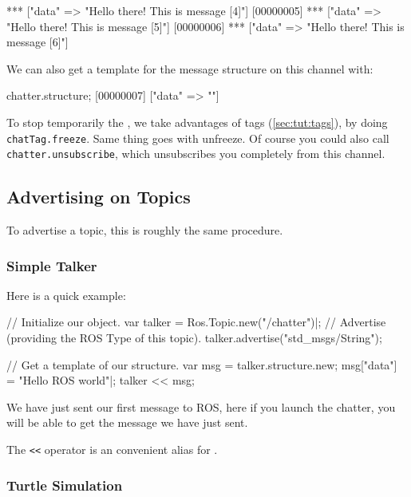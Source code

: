 \begin{urbiunchecked}
[00000004] *** ["data" => "Hello there! This is message [4]"]
[00000005] *** ["data" => "Hello there! This is message [5]"]
[00000006] *** ["data" => "Hello there! This is message [6]"]
\end{urbiunchecked}

We can also get a template for the message structure on this channel with:

\begin{urbiunchecked}
chatter.structure;
[00000007] ["data" => ""]
\end{urbiunchecked}

To stop temporarily the , we take advantages of tags
(\autoref{sec:tut:tags}), by doing \lstinline{chatTag.freeze}.  Same thing
goes with unfreeze.  Of course you could also call
\lstinline{chatter.unsubscribe}, which unsubscribes you completely from this
channel.


\subsection{Advertising on Topics}

To advertise a topic, this is roughly the same procedure.


\subsubsection{Simple Talker}

Here is a quick example:

\begin{urbiunchecked}
// Initialize our object.
var talker = Ros.Topic.new("/chatter")|;
// Advertise (providing the ROS Type of this topic).
talker.advertise("std_msgs/String");

// Get a template of our structure.
var msg = talker.structure.new;
msg["data"] = "Hello ROS world"|;
talker << msg;
\end{urbiunchecked}

We have just sent our first message to ROS, here if you launch the chatter,
you will be able to get the message we have just sent.

The \lstinline{<<} operator is an convenient alias for
.



\subsubsection{Turtle Simulation}
\label{sec:turtlesim}

